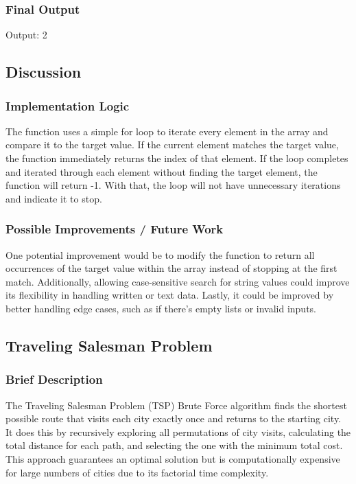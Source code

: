 \documentclass{article}
\begin{document}
\subsubsection*{Final Output}
Output: 2

\subsection*{Discussion}
\subsubsection*{Implementation Logic}
The function uses a simple for loop to iterate every element in the array and compare it to the target value. If the current element matches the target value, the function immediately returns the index of that element. If the loop completes and iterated through each element without finding the target element, the function will return -1. With that, the loop will not have unnecessary iterations and indicate it to stop.

\subsubsection*{Possible Improvements / Future Work}
One potential improvement would be to modify the function to return all occurrences of the target value within the array instead of stopping at the first match. Additionally, allowing case-sensitive search for string values could improve its flexibility in handling written or text data. Lastly, it could be improved by better handling edge cases, such as if there's empty lists or invalid inputs.

\subsection{Traveling Salesman Problem}
\subsubsection*{Brief Description}
The Traveling Salesman Problem (TSP) Brute Force algorithm finds the shortest possible route that visits each city exactly once and returns to the starting city. It does this by recursively exploring all permutations of city visits, calculating the total distance for each path, and selecting the one with the minimum total cost. This approach guarantees an optimal solution but is computationally expensive for large numbers of cities due to its factorial time complexity.
\end{document}
